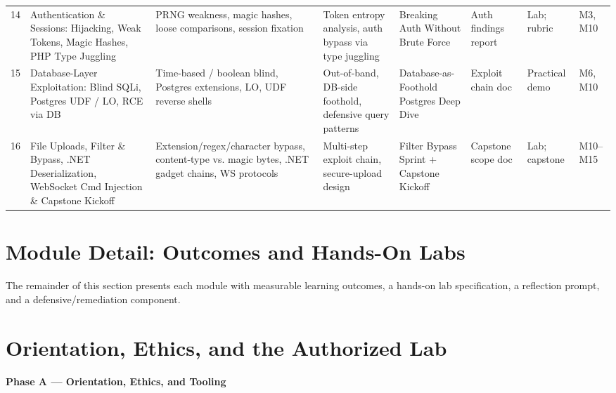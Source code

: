 \documentclass[11pt,letterpaper,oneside]{report}
\begin{document}
\begin{landscape}
\begin{longtable}{@{}R{0.45cm} R{2.085cm} R{3.614cm} R{3.336cm} R{2.919cm} R{2.363cm} R{2.363cm} R{2.780cm}@{}}
14 & Authentication \& Sessions: Hijacking, Weak Tokens, Magic Hashes, PHP Type Juggling
  & PRNG weakness, magic hashes, loose comparisons, session fixation
  & Token entropy analysis, auth bypass via type juggling
  & Breaking Auth Without Brute Force
  & Auth findings report
  & Lab; rubric
  & M3, M10\\

15 & Database-Layer Exploitation: Blind SQLi, Postgres UDF / LO, RCE via DB
  & Time-based / boolean blind, Postgres extensions, LO, UDF reverse shells
  & Out-of-band, DB-side foothold, defensive query patterns
  & Database-as-Foothold Postgres Deep Dive
  & Exploit chain doc
  & Practical demo
  & M6, M10\\

16 & File Uploads, Filter \& Bypass, .NET Deserialization, WebSocket Cmd Injection \& Capstone Kickoff
  & Extension/regex/character bypass, content-type vs. magic bytes, .NET gadget chains, WS protocols
  & Multi-step exploit chain, secure-upload design
  & Filter Bypass Sprint + Capstone Kickoff
  & Capstone scope doc
  & Lab; capstone
  & M10--M15\\
\end{longtable}
\end{landscape}

\chapter*{Module Detail: Outcomes and Hands-On Labs}

The remainder of this section presents each module with measurable learning outcomes, a hands-on lab specification, a reflection prompt, and a defensive/remediation component.

\chapter{Orientation, Ethics, and the Authorized Lab}
\textbf{Phase A --- Orientation, Ethics, and Tooling}
\end{document}
